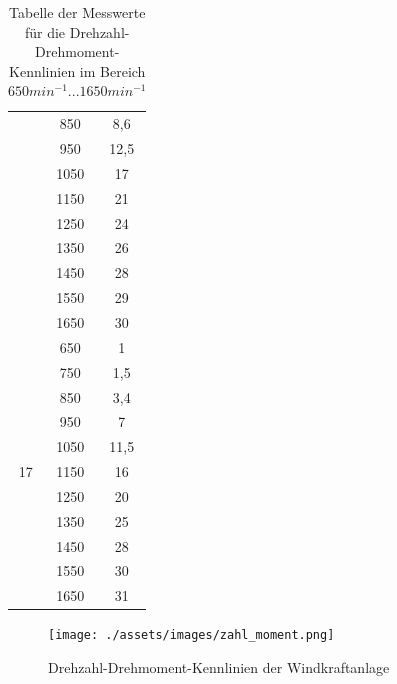 \documentclass{report}
\begin{document}
\begin{table}[]
\begin{tabular}{|c|c|c|}
		                     & 850      & 8,6        \\ \cline{2-4}
		                     & 950      & 12,5       \\ \cline{2-4}
		                     & 1050     & 17         \\ \cline{2-4}
		                     & 1150     & 21         \\ \cline{2-4}
		                     & 1250     & 24         \\ \cline{2-4}
		                     & 1350     & 26         \\ \cline{2-4}
		                     & 1450     & 28         \\ \cline{2-4}
		                     & 1550     & 29         \\ \cline{2-4}
		                     & 1650     & 30         \\ \hline
		\multirow{11}{*}{17} & 650      & 1          \\ \cline{2-4}
		                     & 750      & 1,5        \\ \cline{2-4}
		                     & 850      & 3,4        \\ \cline{2-4}
		                     & 950      & 7          \\ \cline{2-4}
		                     & 1050     & 11,5       \\ \cline{2-4}
		                     & 1150     & 16         \\ \cline{2-4}
		                     & 1250     & 20         \\ \cline{2-4}
		                     & 1350     & 25         \\ \cline{2-4}
		                     & 1450     & 28         \\ \cline{2-4}
		                     & 1550     & 30         \\ \cline{2-4}
		                     & 1650     & 31         \\\hline
	\end{tabular}
	\caption{Tabelle der Messwerte für die Drehzahl-Drehmoment-Kennlinien im Bereich $650min^{-1}...1650min^{-1}$}
	\label{tab:drehzahl_drehmoment}
\end{table}

\begin{figure}[!ht]
	\centering
	\texttt{[image: ./assets/images/zahl\_moment.png]}
	\caption{Drehzahl-Drehmoment-Kennlinien der Windkraftanlage}
	\label{fig:zahl_moment}
\end{figure}
\end{document}
